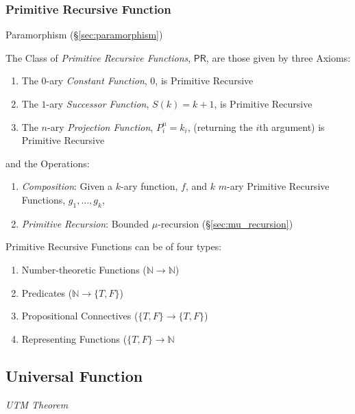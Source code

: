 \subsubsection{Primitive Recursive Function}
\label{sec:primitive_recursive}

Paramorphism (\S\ref{sec:paramorphism})

The Class of \emph{Primitive Recursive Functions}, $\mathsf{PR}$, are
those given by three Axioms:
\begin{enumerate}
  \item The $0$-ary \emph{Constant Function}, $0$, is Primitive
    Recursive
  \item The $1$-ary \emph{Successor Function}, $S(k) = k + 1$, is
    Primitive Recursive
  \item The $n$-ary \emph{Projection Function}, $P_i^n = k_i$,
    (returning the $i$th argument) is Primitive Recursive
\end{enumerate}
and the Operations:
\begin{enumerate}
  \item \emph{Composition}: Given a $k$-ary function, $f$, and $k$
    $m$-ary Primitive Recursive Functions, $g_1, \ldots, g_k$,
  \item \emph{Primitive Recursion}: Bounded $\mu$-recursion
    (\S\ref{sec:mu_recursion})
\end{enumerate}

Primitive Recursive Functions can be of four types: \cite{kleene52}

\begin{enumerate}
\item Number-theoretic Functions ($\mathbb{N} \rightarrow \mathbb{N}$)
\item Predicates ($\mathbb{N} \rightarrow \{T,F\}$)
\item Propositional Connectives ($\{T,F\} \rightarrow \{T,F\}$)
\item Representing Functions ($\{T,F\} \rightarrow \mathbb{N}$
\end{enumerate}



\subsection{Universal Function}\label{sec:universal_function}

\emph{UTM Theorem}

